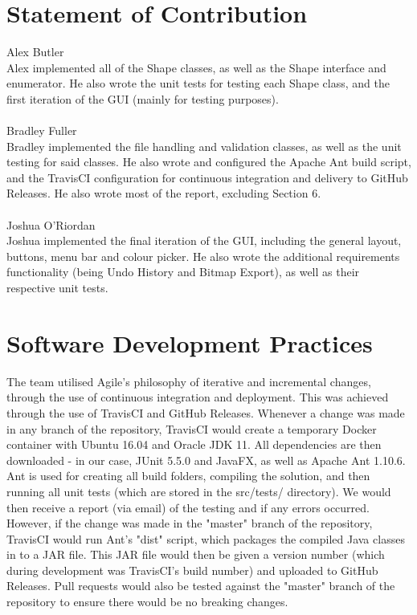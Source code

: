 \documentclass[12pt]{article} %
\begin{document}
\newpage

\section{Statement of Contribution}

{\large Alex Butler}\\
Alex implemented all of the Shape classes, as well as the Shape interface and enumerator. He also wrote the unit tests for testing each Shape class, and the first iteration of the GUI (mainly for testing purposes). 
\\\\{\large Bradley Fuller}\\
Bradley implemented the file handling and validation classes, as well as the unit testing for said classes. He also wrote and configured the Apache Ant build script, and the TravisCI configuration for continuous integration and delivery to GitHub Releases. He also wrote most of the report, excluding Section 6.
\\\\{\large Joshua O'Riordan}\\
Joshua implemented the final iteration of the GUI, including the general layout, buttons, menu bar and colour picker. He also wrote the additional requirements functionality (being Undo History and Bitmap Export), as well as their respective unit tests.

\newpage

\section{Software Development Practices}

The team utilised Agile's philosophy of iterative and incremental changes, through the use of continuous integration and deployment. This was achieved through the use of TravisCI and GitHub Releases. Whenever a change was made in any branch of the repository, TravisCI would create a temporary Docker container with Ubuntu 16.04 and Oracle JDK 11. All dependencies are then downloaded - in our case, JUnit 5.5.0 and JavaFX, as well as Apache Ant 1.10.6. Ant is used for creating all build folders, compiling the solution, and then running all unit tests (which are stored in the src/tests/ directory). We would then receive a report (via email) of the testing and if any errors occurred. However, if the change was made in the "master" branch of the repository, TravisCI would run Ant's "dist" script, which packages the compiled Java classes in to a JAR file. This JAR file would then be given a version number (which during development was TravisCI's build number) and uploaded to GitHub Releases. Pull requests would also be tested against the "master" branch of the repository to ensure there would be no breaking changes.
\end{document}

